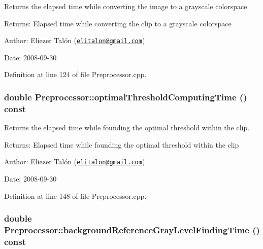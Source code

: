 Returns the elapsed time while converting the image to a grayscale colorspace. 

\begin{Desc}
\item[Returns:]Elapsed time while converting the clip to a grayscale colorspace\end{Desc}
\begin{Desc}
\item[Author:]Eliezer Talón (\href{mailto:elitalon@gmail.com}{\tt elitalon@gmail.com}) \end{Desc}
\begin{Desc}
\item[Date:]2008-09-30 \end{Desc}


Definition at line 124 of file Preprocessor.cpp.\hypertarget{class_preprocessor_72dd29238c4202698e67dcb26a47f4b5}{
\subsubsection[optimalThresholdComputingTime]{\setlength{\rightskip}{0pt plus 5cm}double Preprocessor::optimalThresholdComputingTime () const}}
\label{class_preprocessor_72dd29238c4202698e67dcb26a47f4b5}


Returns the elapsed time while founding the optimal threshold within the clip. 

\begin{Desc}
\item[Returns:]Elapsed time while founding the optimal threshold within the clip\end{Desc}
\begin{Desc}
\item[Author:]Eliezer Talón (\href{mailto:elitalon@gmail.com}{\tt elitalon@gmail.com}) \end{Desc}
\begin{Desc}
\item[Date:]2008-09-30 \end{Desc}


Definition at line 148 of file Preprocessor.cpp.\hypertarget{class_preprocessor_3189cad5515476d54cc14effcf983fc7}{
\subsubsection[backgroundReferenceGrayLevelFindingTime]{\setlength{\rightskip}{0pt plus 5cm}double Preprocessor::backgroundReferenceGrayLevelFindingTime () const}}
\label{class_preprocessor_3189cad5515476d54cc14effcf983fc7}


